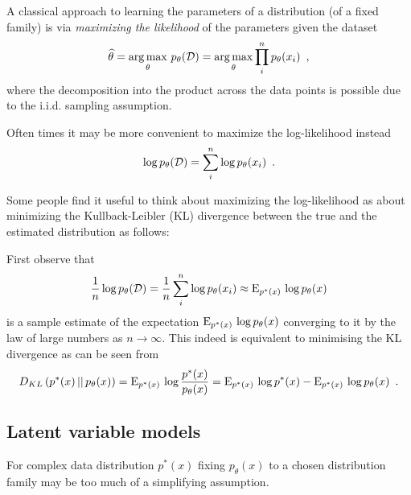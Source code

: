 A classical approach to learning the parameters of a distribution (of a fixed family) is via \emph{maximizing the likelihood} of the parameters given the dataset
\begin{equation}
\widehat{\theta} = \operatorname*{arg\,max}_{\theta} \, p_{\theta}(\mathcal{D}) = \operatorname*{arg\,max}_{\theta} \prod_i^n p_{\theta}(x_i) \enspace ,
\end{equation}
where the decomposition into the product across the data points is possible due to the i.i.d. sampling assumption.

Often times it may be more convenient to maximize the log-likelihood instead
\begin{equation}
\log p_{\theta}(\mathcal{D}) = \sum_i^n \log p_{\theta}(x_i) \enspace .
\end{equation}

Some people find it useful to think about maximizing the log-likelihood as about minimizing the Kullback-Leibler (KL) divergence between the true and the estimated distribution as follows:

First observe that 
\begin{equation}\label{eg:var_likelihood}
\frac{1}{n} \log p_{\theta}(\mathcal{D}) = \frac{1}{n} \sum_i^n \log p_{\theta}(x_i) \approx \mathrm{E}_{p^*(x)} \, \log p_{\theta}(x)
\end{equation}
is a sample estimate of the expectation $\mathrm{E}_{p^*(x)} \, \log p_{\theta}(x)$ converging to it by the law of large numbers as $n \to \infty$.
This indeed is equivalent to minimising the KL divergence as can be seen from 
\begin{equation}
D_{KL} \left( p^*(x) \, || \, p_{\theta}(x) \right) = \mathrm{E}_{p^*(x)} \, \log \frac{p^*(x)}{p_{\theta}(x)} = 
\mathrm{E}_{p^*(x)} \, \log p^*(x) - \mathrm{E}_{p^*(x)} \, \log p_{\theta}(x) \enspace .
\end{equation}

\subsection{Latent variable models}\label{sec:Vae_latent}

For complex data distribution $p^*(x)$ fixing $p_{\theta}(x)$ to a chosen distribution family may be too much of a simplifying assumption.


